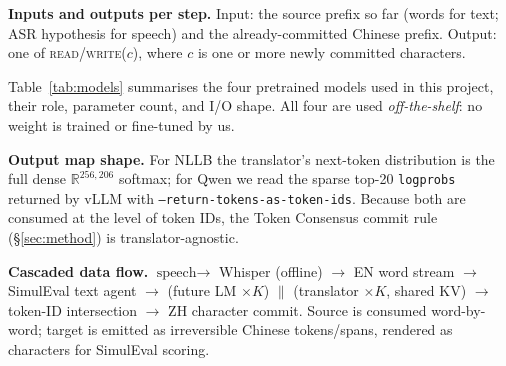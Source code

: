 \documentclass{article}
\begin{document}
\textbf{Inputs and outputs per step.} Input: the source prefix so far (words for text; ASR
hypothesis for speech) and the already-committed Chinese prefix. Output: one of
\textsc{read}/\textsc{write}($c$), where $c$ is one or more newly committed characters.

Table~\ref{tab:models} summarises the four pretrained models used in this project, their role,
parameter count, and I/O shape. All four are used \emph{off-the-shelf}: no weight is trained or
fine-tuned by us.

\begin{table}[h]
\caption{Model inventory. Each component is a frozen open-weight model; only the inference-time
policy (\S\ref{sec:method}) is our contribution.}
\label{tab:models}
\centering
{}
\end{table}

\textbf{Output map shape.} For NLLB the translator's next-token distribution is the full dense
$\mathbb{R}^{256{,}206}$ softmax; for Qwen we read the sparse top-20 \texttt{logprobs} returned by
vLLM with \texttt{--return-tokens-as-token-ids}. Because both are consumed at the level of token
IDs, the Token Consensus commit rule (\S\ref{sec:method}) is translator-agnostic.

\textbf{Cascaded data flow.}
$\text{speech}\rightarrow$ Whisper (offline) $\rightarrow$ EN word stream $\rightarrow$ SimulEval
text agent $\rightarrow$ (future LM $\times K$) $\parallel$ (translator $\times K$, shared KV)
$\rightarrow$ token-ID intersection $\rightarrow$ ZH character commit. Source is consumed
word-by-word; target is emitted as irreversible Chinese tokens/spans, rendered as characters for
SimulEval scoring.
\end{document}
